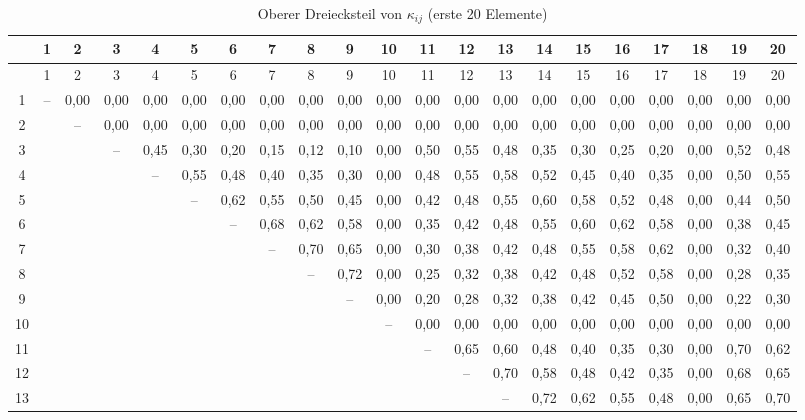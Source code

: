 \documentclass[12pt,a4paper]{article}
\begin{document}
{\tiny
	\begin{longtable}{c|*{20}{c}}
		\caption{Oberer Dreiecksteil von \(\kappa_{ij}\) (erste 20 Elemente)} \label{tab:kappa-full-20} \\
		\toprule
		& 1 & 2 & 3 & 4 & 5 & 6 & 7 & 8 & 9 & 10 & 11 & 12 & 13 & 14 & 15 & 16 & 17 & 18 & 19 & 20 \\
		\midrule
		\endfirsthead
		\toprule
		& 1 & 2 & 3 & 4 & 5 & 6 & 7 & 8 & 9 & 10 & 11 & 12 & 13 & 14 & 15 & 16 & 17 & 18 & 19 & 20 \\
		\midrule
		\endhead
		1  & – & 0,00 & 0,00 & 0,00 & 0,00 & 0,00 & 0,00 & 0,00 & 0,00 & 0,00 & 0,00 & 0,00 & 0,00 & 0,00 & 0,00 & 0,00 & 0,00 & 0,00 & 0,00 & 0,00 \\
		2  &   & – & 0,00 & 0,00 & 0,00 & 0,00 & 0,00 & 0,00 & 0,00 & 0,00 & 0,00 & 0,00 & 0,00 & 0,00 & 0,00 & 0,00 & 0,00 & 0,00 & 0,00 & 0,00 \\
		3  &   &   & – & 0,45 & 0,30 & 0,20 & 0,15 & 0,12 & 0,10 & 0,00 & 0,50 & 0,55 & 0,48 & 0,35 & 0,30 & 0,25 & 0,20 & 0,00 & 0,52 & 0,48 \\
		4  &   &   &   & – & 0,55 & 0,48 & 0,40 & 0,35 & 0,30 & 0,00 & 0,48 & 0,55 & 0,58 & 0,52 & 0,45 & 0,40 & 0,35 & 0,00 & 0,50 & 0,55 \\
		5  &   &   &   &   & – & 0,62 & 0,55 & 0,50 & 0,45 & 0,00 & 0,42 & 0,48 & 0,55 & 0,60 & 0,58 & 0,52 & 0,48 & 0,00 & 0,44 & 0,50 \\
		6  &   &   &   &   &   & – & 0,68 & 0,62 & 0,58 & 0,00 & 0,35 & 0,42 & 0,48 & 0,55 & 0,60 & 0,62 & 0,58 & 0,00 & 0,38 & 0,45 \\
		7  &   &   &   &   &   &   & – & 0,70 & 0,65 & 0,00 & 0,30 & 0,38 & 0,42 & 0,48 & 0,55 & 0,58 & 0,62 & 0,00 & 0,32 & 0,40 \\
		8  &   &   &   &   &   &   &   & – & 0,72 & 0,00 & 0,25 & 0,32 & 0,38 & 0,42 & 0,48 & 0,52 & 0,58 & 0,00 & 0,28 & 0,35 \\
		9  &   &   &   &   &   &   &   &   & – & 0,00 & 0,20 & 0,28 & 0,32 & 0,38 & 0,42 & 0,45 & 0,50 & 0,00 & 0,22 & 0,30 \\
		10 &   &   &   &   &   &   &   &   &   & – & 0,00 & 0,00 & 0,00 & 0,00 & 0,00 & 0,00 & 0,00 & 0,00 & 0,00 & 0,00 \\
		11 &   &   &   &   &   &   &   &   &   &   & – & 0,65 & 0,60 & 0,48 & 0,40 & 0,35 & 0,30 & 0,00 & 0,70 & 0,62 \\
		12 &   &   &   &   &   &   &   &   &   &   &   & – & 0,70 & 0,58 & 0,48 & 0,42 & 0,35 & 0,00 & 0,68 & 0,65 \\
		13 &   &   &   &   &   &   &   &   &   &   &   &   & – & 0,72 & 0,62 & 0,55 & 0,48 & 0,00 & 0,65 & 0,70 \\

\end{longtable}}
\end{document}
